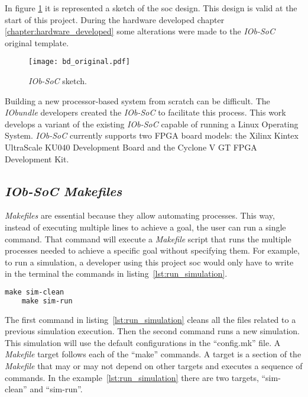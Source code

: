 In figure \ref{fig:bd_original} it is represented a sketch of the \acrshort{soc} design. This design is valid at the start of this project. During the hardware developed chapter \ref{chapter:hardware_developed} some alterations were made to the \textit{IOb-SoC} original template.

\begin{figure}[!h]
    \centering
    \texttt{[image: bd\_original.pdf]}
    \caption{\textit{IOb-SoC} sketch.}
    \label{fig:bd_original}
\end{figure}

Building a new processor-based system from scratch can be difficult. The \textit{IObundle} developers created the \textit{IOb-SoC} to facilitate this process. This work develops a variant of the existing \textit{IOb-SoC} capable of running a Linux Operating System. \textit{IOb-SoC} currently supports two FPGA board models: the Xilinx Kintex UltraScale KU040 Development Board and the Cyclone V GT FPGA Development Kit.

\subsection{\textit{IOb-SoC} \textit{Makefiles}}
\label{subsection:iob_makefiles}
\textit{Makefiles} are essential because they allow automating processes. This way, instead of executing multiple lines to achieve a goal, the user can run a single command. That command will execute a \textit{Makefile} script that runs the multiple processes needed to achieve a specific goal without specifying them. For example, to run a simulation, a developer using this project \acrshort{soc} would only have to write in the terminal the commands in listing~\ref{lst:run_simulation}.

\begin{lstlisting}[language=make, caption={Run a simulation.}, label=lst:run_simulation]
    make sim-clean
    make sim-run
\end{lstlisting}

The first command in listing~\ref{lst:run_simulation} cleans all the files related to a previous simulation execution. Then the second command runs a new simulation. This simulation will use the default configurations in the \enquote{config.mk} file. A \textit{Makefile} target follows each of the \enquote{make} commands. A target is a section of the \textit{Makefile} that may or may not depend on other targets and executes a sequence of commands. In the example~\ref{lst:run_simulation} there are two targets, \enquote{sim-clean} and \enquote{sim-run}.

